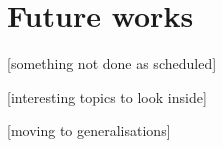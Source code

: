 \chapter{Future works}

 [something not done as scheduled]

 [interesting topics to look inside]

 [moving to generalisations]